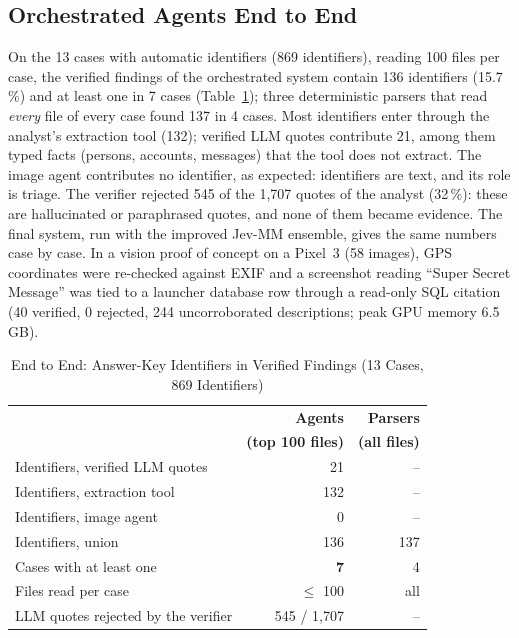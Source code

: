 \documentclass[conference]{IEEEtran}
\begin{document}
\subsection{Orchestrated Agents End to End}
On the 13 cases with automatic identifiers (869 identifiers), reading 100 files per case, the verified findings of
the orchestrated system contain 136 identifiers (15.7\,\%) and at least one in 7 cases (Table~\ref{tab:e2e}); three
deterministic parsers that read \emph{every} file of every case found 137 in 4 cases. Most identifiers enter through
the analyst's extraction tool (132); verified LLM quotes contribute 21, among them typed facts (persons, accounts,
messages) that the tool does not extract. The image agent contributes no identifier, as expected: identifiers are
text, and its role is triage. The verifier rejected 545 of the 1{,}707 quotes of the analyst (32\,\%): these are
hallucinated or paraphrased quotes, and none of them became evidence. The final system, run with the improved Jev-MM
ensemble, gives the same numbers case by case. In a vision proof of concept on a Pixel~3 (58 images), GPS
coordinates were re-checked against EXIF and a screenshot reading ``Super Secret Message'' was tied to a launcher
database row through a read-only SQL citation (40 verified, 0 rejected, 244 uncorroborated descriptions; peak GPU
memory 6.5\,GB).

\begin{table}[t]
\caption{End to End: Answer-Key Identifiers in Verified Findings (13 Cases, 869 Identifiers)}
\label{tab:e2e}
\centering
\small
\begin{tabular}{@{}lrr@{}}
\toprule
& \textbf{Agents} & \textbf{Parsers} \\
& \textbf{(top 100 files)} & \textbf{(all files)} \\
\midrule
Identifiers, verified LLM quotes & 21 & -- \\
Identifiers, extraction tool & 132 & -- \\
Identifiers, image agent & 0 & -- \\
Identifiers, union & 136 & 137 \\
Cases with at least one & \textbf{7} & 4 \\
Files read per case & $\le$ 100 & all \\
LLM quotes rejected by the verifier & 545 / 1{,}707 & -- \\
\bottomrule
\end{tabular}
\end{table}
\end{document}
